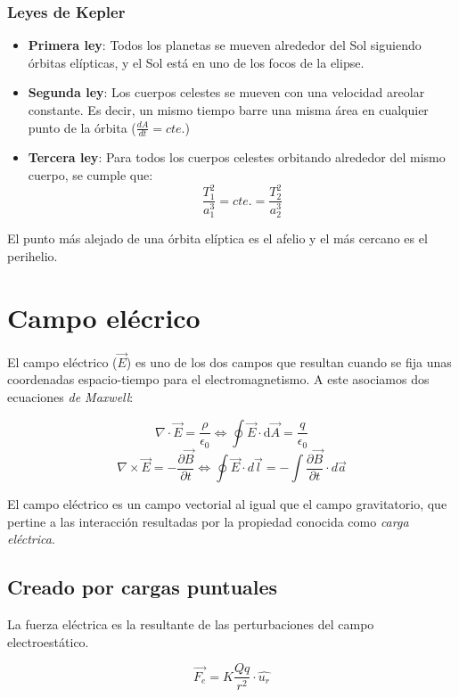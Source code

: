 \documentclass[10pt]{article}
\newcommand{\diff}{\mathrm{d}}
\begin{document}
\subsubsection{Leyes de Kepler}

\begin{itemize}
  \item \textbf{Primera ley}: Todos los planetas se mueven alrededor del Sol siguiendo órbitas elípticas, y el Sol está en uno de los focos de la elipse.
  \item \textbf{Segunda ley}: Los cuerpos celestes se mueven con una velocidad areolar constante. Es decir, un mismo tiempo barre una misma área en cualquier punto de la órbita ($ \frac{dA}{dt} = cte. $)
  \item \textbf{Tercera ley}: Para todos los cuerpos celestes orbitando alrededor del mismo cuerpo, se cumple que:
    $$ \frac{T^2_1}{a^3_1} = cte. = \frac{T^2_2}{a^3_2} $$
\end{itemize}

El punto más alejado de una órbita elíptica es el afelio y el más cercano es el perihelio.

\section{Campo elécrico}

El campo eléctrico ($ \vec{E} $) es uno de los dos campos que resultan cuando se fija unas coordenadas espacio-tiempo para el electromagnetismo.
A este asociamos dos ecuaciones \textit{de Maxwell}:

\[ \nabla \cdot \vec{E} = \frac{\rho}{\epsilon_0} \iff \oint \vec{E} \cdot \diff \vec{A} = \frac{q}{\epsilon_0} \]
\[ \nabla \times \vec{E} = -\frac{\partial \vec{B}}{\partial t} \iff \oint \vec{E} \cdot d\vec{l} = - \int \frac{\partial \vec{B}}{\partial t} \cdot d \vec{a} \]

El campo eléctrico es un campo vectorial al igual que el campo gravitatorio, que pertine a las interacción resultadas por la propiedad
conocida como \textit{carga eléctrica}.

\subsection{Creado por cargas puntuales}

\begin{definition}
  La fuerza eléctrica es la resultante de las perturbaciones del campo electroestático.

  \[ \vec{F_e} = K\frac{Q q}{r^2} \cdot \hat{u_r} \]
\end{definition}
\end{document}
